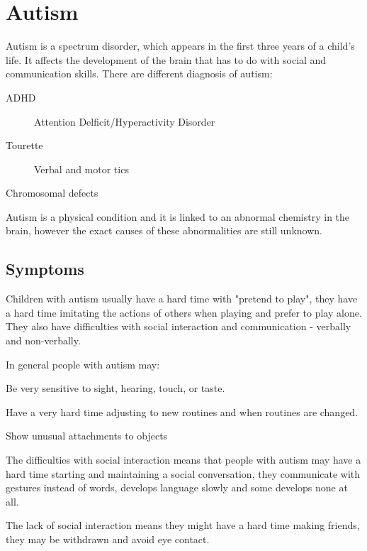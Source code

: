 \section{Autism}

Autism is a spectrum disorder, which appears in the first three years of a child's life. It affects the development of the brain that has to do with social and communication skills. There are different diagnosis of autism:

\begin{description}
\item[ADHD] Attention Delficit/Hyperactivity Disorder
\item[Tourette] Verbal and motor tics
\item[Chromosomal defects]
\end{description}

Autism is a physical condition and it is linked to an abnormal chemistry in the brain, however the exact causes of these abnormalities are still unknown. 

\subsection*{Symptoms} 

Children with autism usually have a hard time with "pretend to play", they have a hard time imitating the actions of others when playing and prefer to play alone. They also have difficulties with social interaction and communication - verbally and non-verbally. 

In general people with autism may:

\begin{description}
\item Be very sensitive to sight, hearing, touch, or taste.
\item Have a very hard time adjusting to new routines and when routines are changed.
\item Show unusual attachments to objects
\end{description} 

The difficulties with social interaction means that people with autism may have a hard time starting and maintaining a social conversation, they communicate with gestures instead of words, develops language slowly and some develops none at all. 

The lack of social interaction means they might have a hard time making friends, they may be withdrawn and avoid eye contact. 

